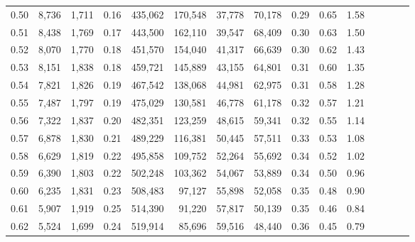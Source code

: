 \begin{tabular}{rrrcrrrrrrrrrrr}
0.50 &   8,736 &  1,711 &                                       0.16 &  435,062 &  170,548 &   37,778 &   70,178 &  0.29 &  0.65 &                         1.58 \\
0.51 &   8,438 &  1,769 &                                       0.17 &  443,500 &  162,110 &   39,547 &   68,409 &  0.30 &  0.63 &                         1.50 \\
0.52 &   8,070 &  1,770 &                                       0.18 &  451,570 &  154,040 &   41,317 &   66,639 &  0.30 &  0.62 &                         1.43 \\
0.53 &   8,151 &  1,838 &                                       0.18 &  459,721 &  145,889 &   43,155 &   64,801 &  0.31 &  0.60 &                         1.35 \\
0.54 &   7,821 &  1,826 &                                       0.19 &  467,542 &  138,068 &   44,981 &   62,975 &  0.31 &  0.58 &                         1.28 \\
0.55 &   7,487 &  1,797 &                                       0.19 &  475,029 &  130,581 &   46,778 &   61,178 &  0.32 &  0.57 &                         1.21 \\
0.56 &   7,322 &  1,837 &                                       0.20 &  482,351 &  123,259 &   48,615 &   59,341 &  0.32 &  0.55 &                         1.14 \\
0.57 &   6,878 &  1,830 &                                       0.21 &  489,229 &  116,381 &   50,445 &   57,511 &  0.33 &  0.53 &                         1.08 \\
0.58 &   6,629 &  1,819 &                                       0.22 &  495,858 &  109,752 &   52,264 &   55,692 &  0.34 &  0.52 &                         1.02 \\
0.59 &   6,390 &  1,803 &                                       0.22 &  502,248 &  103,362 &   54,067 &   53,889 &  0.34 &  0.50 &                         0.96 \\
0.60 &   6,235 &  1,831 &                                       0.23 &  508,483 &   97,127 &   55,898 &   52,058 &  0.35 &  0.48 &                         0.90 \\
0.61 &   5,907 &  1,919 &                                       0.25 &  514,390 &   91,220 &   57,817 &   50,139 &  0.35 &  0.46 &                         0.84 \\
0.62 &   5,524 &  1,699 &                                       0.24 &  519,914 &   85,696 &   59,516 &   48,440 &  0.36 &  0.45 &                         0.79 \\

\end{tabular}
